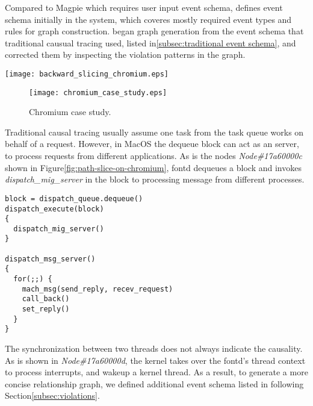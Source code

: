 Compared to Magpie which requires user input event schema,
\xxx defines event schema initially in the system,
which coveres mostly required event types and rules
for graph construction.
\xxx began graph generation from the event schema
that traditional causual tracing used,
listed in\ref{subsec:traditional event schema},
and corrected them by inspecting the violation patterns in the graph.

\begin{figure*}[tb]
    \centering
    \texttt{[image: backward\_slicing\_chromium.eps]}
    \caption{Chromium backward path slicing.}
    \label{fig:path-slice-on-chromium}
\end{figure*}

\begin{figure}[tb]
    \centering
    \texttt{[image: chromium\_case\_study.eps]}
    \caption{Chromium case study.}
    \label{fig:chromium-trace}
\end{figure}

Traditional causal tracing usually assume one task from
the task queue works on behalf of a request.
However, in MacOS the dequeue block can act as an server,
to process requests from different applications.
As is the nodes \textit{Node\#17a60000c} shown in Figure\ref{fig:path-slice-on-chromium},
fontd dequeues a block and invokes \textit{dispatch\_mig\_server}
in the block to processing message from
different processes.
\begin{lstlisting}[basicstyle=\small\linespread{0.6}]
block = dispatch_queue.dequeue()
dispatch_execute(block)
{
  dispatch_mig_server()
}

dispatch_msg_server()
{
  for(;;) {
    mach_msg(send_reply, recev_request)
    call_back()
    set_reply()
  }
}
\end{lstlisting}

The synchronization between two threads does not
always indicate the causality.
As is shown in \textit{Node\#17a60000d}, the kernel takes over the fontd's thread context to process
interrupts, and wakeup a kernel thread.
As a result, to generate a more concise relationship graph,
we defined additional event schema listed in following Section\ref{subsec:violations}.

